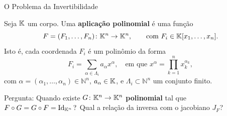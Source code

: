 \begin{frame}[t]{O Problema da Invertibilidade}
\small

Seja $\mathbb{K}$ um corpo. Uma \textbf{aplicação polinomial} é uma função
\[
F=(F_1,\ldots,F_n)\colon \mathbb{K}^n \to \mathbb{K}^n,
\qquad \text{com } F_i \in \mathbb{K}[x_1,\ldots,x_n].
\]
Isto é, cada coordenada $F_i$ é um polinômio da forma
\[
F_i=\sum_{\alpha\in \varLambda_i} a_\alpha x^\alpha,
\quad \text{em que } x^\alpha=\prod_{k=1}^n x_k^{\alpha_k},
\]
com $\alpha=(\alpha_1,\ldots,\alpha_n)\in \mathbb{N}^n$, $a_\alpha\in \mathbb{K}$, e $\varLambda_i\subset \mathbb{N}^n$ um conjunto finito.
\pause
  \begin{defbox}{Pergunta:}
    Quando existe $G\colon\mathbb{K}^n\to\mathbb{K}^n$ \textbf{polinomial} tal que
    \(
      F \circ G = G \circ F = \mathrm{Id}_{\mathbb{K}^n}\,?
    \)
    Qual a relação da inversa com o jacobiano $J_F$?
  \end{defbox}


\end{frame}